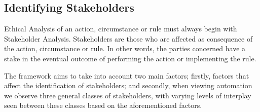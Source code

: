 \subsection{Identifying Stakeholders}
\label{sec:-identify}
Ethical Analysis of an action, circumstance or rule must always begin with Stakeholder Analysis. Stakeholders are those who are affected as consequence of the action, circumstance or rule. In other words, the parties concerned have a stake in the eventual outcome of performing the action or implementing the rule.

The framework aims to take into account two main factors; firstly, factors that affect the identification of stakeholders; and secondly, when viewing automation we observe three general classes of stakeholders, with varying levels of interplay seen between these classes based on the aforementioned factors.

